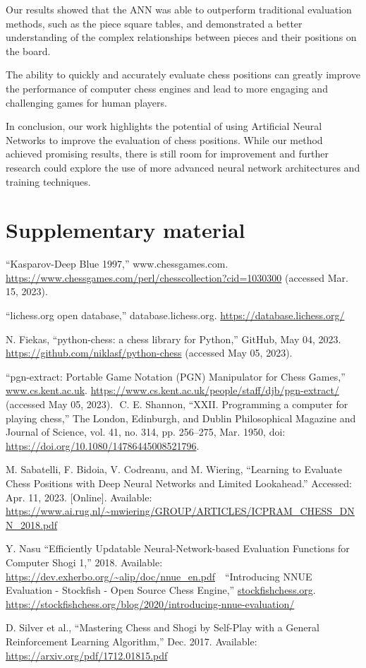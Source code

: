 \documentclass[conference]{IEEEtran}
\begin{document}
Our results showed that the ANN was able to outperform traditional evaluation methods, such as the piece square tables, and demonstrated a better understanding of the complex relationships between pieces and their positions on the board.

The ability to quickly and accurately evaluate chess positions can greatly improve the performance of computer chess engines and lead to more engaging and challenging games for human players.

In conclusion, our work highlights the potential of using Artificial Neural Networks to improve the evaluation of chess positions. While our method achieved promising results, there is still room for improvement and further research could explore the use of more advanced neural network architectures and training techniques. 

\section{Supplementary material}\label{supplementary material}


\begin{thebibliography}{00}
“Kasparov-Deep Blue 1997,” www.chessgames.com. \url{https://www.chessgames.com/perl/chesscollection?cid=1030300} (accessed Mar. 15, 2023).

“lichess.org open database,” database.lichess.org. \url{https://database.lichess.org/}

N. Fiekas, “python-chess: a chess library for Python,” GitHub, May 04, 2023. \url{https://github.com/niklasf/python-chess} (accessed May 05, 2023).

“pgn-extract: Portable Game Notation (PGN) Manipulator for Chess Games,” \url{www.cs.kent.ac.uk}. \url{https://www.cs.kent.ac.uk/people/staff/djb/pgn-extract/} (accessed May 05, 2023).
‌
C. E. Shannon, “XXII. Programming a computer for playing chess,” The London, Edinburgh, and Dublin Philosophical Magazine and Journal of Science, vol. 41, no. 314, pp. 256–275, Mar. 1950, doi: \url{https://doi.org/10.1080/14786445008521796}.

M. Sabatelli, F. Bidoia, V. Codreanu, and M. Wiering, “Learning to Evaluate Chess Positions with Deep Neural Networks and Limited Lookahead.” Accessed: Apr. 11, 2023. [Online]. Available: \url{https://www.ai.rug.nl/~mwiering/GROUP/ARTICLES/ICPRAM_CHESS_DNN_2018.pdf}

Y. Nasu “Efficiently Updatable Neural-Network-based Evaluation Functions for Computer Shogi 1,” 2018. Available: \url{https://dev.exherbo.org/~alip/doc/nnue_en.pdf}
‌
‌ “Introducing NNUE Evaluation - Stockfish - Open Source Chess Engine,” \url{stockfishchess.org}. \url{https://stockfishchess.org/blog/2020/introducing-nnue-evaluation/}

 D. Silver et al., “Mastering Chess and Shogi by Self-Play with a General Reinforcement Learning Algorithm,” Dec. 2017. Available: \url{https://arxiv.org/pdf/1712.01815.pdf}

\end{thebibliography}
\end{document}
